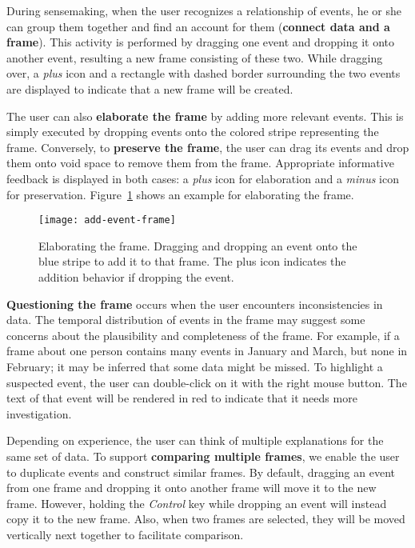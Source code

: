 During sensemaking, when the user recognizes a relationship of events, he or she can group them together and find an account for them (\textbf{connect data and a frame}). This activity is performed by dragging one event and dropping it onto another event, resulting a new frame consisting of these two. While dragging over, a \emph{plus} icon and a rectangle with dashed border surrounding the two events are displayed to indicate that a new frame will be created. 

The user can also \textbf{elaborate the frame} by adding more relevant events. This is simply executed by dropping events onto the colored stripe representing the frame. Conversely, to \textbf{preserve the frame}, the user can drag its events and drop them onto void space to remove them from the frame. Appropriate informative feedback is displayed in both cases: a \emph{plus} icon for elaboration and a \emph{minus} icon for preservation. Figure~\ref{fig:add-event-frame} shows an example for elaborating the frame.

\begin{figure}[!htb]
	\centering
	\texttt{[image: add-event-frame]}
	\caption{Elaborating the frame. Dragging and dropping an event onto the blue stripe to add it to that frame. The plus icon indicates the addition behavior if dropping the event.}
	\label{fig:add-event-frame}
\end{figure}

\textbf{Questioning the frame} occurs when the user encounters inconsistencies in data. The temporal distribution of events in the frame may suggest some concerns about the plausibility and completeness of the frame. For example, if a frame about one person contains many events in January and March, but none in February; it may be inferred that some data might be missed. To highlight a suspected event, the user can double-click on it with the right mouse button. The text of that event will be rendered in red to indicate that it needs more investigation. 

Depending on experience, the user can think of multiple explanations for the same set of data. To support \textbf{comparing multiple frames}, we enable the user to duplicate events and construct similar frames. By default, dragging an event from one frame and dropping it onto another frame will move it to the new frame. However, holding the \emph{Control} key while dropping an event will instead copy it to the new frame. Also, when two frames are selected, they will be moved vertically next together to facilitate comparison.

